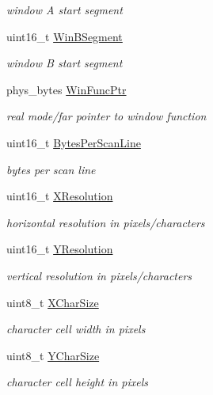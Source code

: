 \begin{DoxyCompactItemize}
\begin{DoxyCompactList}\small\item\em window A start segment \end{DoxyCompactList}\item 
uint16\+\_\+t \hyperlink{struct____attribute_____a9edf422a931df7c7a1d5f82afb911566}{Win\+B\+Segment}
\begin{DoxyCompactList}\small\item\em window B start segment \end{DoxyCompactList}\item 
phys\+\_\+bytes \hyperlink{struct____attribute_____affd250a4766543099f253e27af3abc35}{Win\+Func\+Ptr}
\begin{DoxyCompactList}\small\item\em real mode/far pointer to window function \end{DoxyCompactList}\item 
uint16\+\_\+t \hyperlink{struct____attribute_____afe40654a51bf4a12a8b376ff3506688e}{Bytes\+Per\+Scan\+Line}
\begin{DoxyCompactList}\small\item\em bytes per scan line \end{DoxyCompactList}\item 
uint16\+\_\+t \hyperlink{struct____attribute_____a16f6408e5a85c7a7785a0cee64b6a219}{X\+Resolution}
\begin{DoxyCompactList}\small\item\em horizontal resolution in pixels/characters \end{DoxyCompactList}\item 
uint16\+\_\+t \hyperlink{struct____attribute_____afa8aba2156994750d500f85d0f8425cb}{Y\+Resolution}
\begin{DoxyCompactList}\small\item\em vertical resolution in pixels/characters \end{DoxyCompactList}\item 
uint8\+\_\+t \hyperlink{struct____attribute_____a047d8f41434f02589d0c9b90b17c67eb}{X\+Char\+Size}
\begin{DoxyCompactList}\small\item\em character cell width in pixels \end{DoxyCompactList}\item 
uint8\+\_\+t \hyperlink{struct____attribute_____a330f00ebd49dccd2325d43cdbd646f09}{Y\+Char\+Size}
\begin{DoxyCompactList}\small\item\em character cell height in pixels \end{DoxyCompactList}\item 

\end{DoxyCompactItemize}
